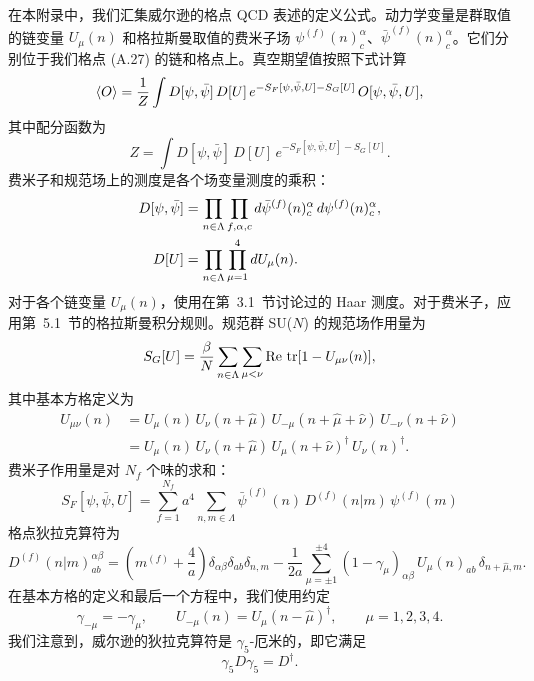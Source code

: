在本附录中，我们汇集威尔逊的格点 QCD 表述的定义公式。动力学变量是群取值的链变量 $U_\mu(n)$ 和格拉斯曼取值的费米子场 $\psi^{(f)}(n)^\alpha_c$、$\bar{\psi}^{(f)}(n)^\alpha_c$。它们分别位于我们格点 (A.27) 的链和格点上。真空期望值按照下式计算
\begin{equation}
  \left\langle O \right\rangle = \frac{1}{Z}\int D[\psi,\bar{\psi}]\,D[U]\,
  e^{-S_F[\psi,\bar{\psi},U]-S_G[U]}\,O[\psi,\bar{\psi},U],
\end{equation}
其中配分函数为
\begin{equation}
  Z = \int D[\psi,\bar{\psi}]\,D[U]\,
  e^{-S_F[\psi,\bar{\psi},U]-S_G[U]} .
\end{equation}
费米子和规范场上的测度是各个场变量测度的乘积：
\begin{align}
  D[\psi,\bar{\psi}] &= \prod_{n\in\Lambda}\prod_{f,\alpha,c}
  d\bar{\psi}^{(f)}(n)^\alpha_c\,d\psi^{(f)}(n)^\alpha_c, \notag\\
  D[U] &= \prod_{n\in\Lambda}\prod_{\mu=1}^{4} dU_\mu(n).
\end{align}
对于各个链变量 $U_\mu(n)$，使用在第~3.1~节讨论过的 Haar 测度。对于费米子，应用第~5.1~节的格拉斯曼积分规则。规范群 SU($N$) 的规范场作用量为
\begin{equation}
  S_G[U] = \frac{\beta}{N}\sum_{n\in\Lambda}\sum_{\mu<\nu}\operatorname{Re}\,\operatorname{tr}[1 - U_{\mu\nu}(n)],
\end{equation}
其中基本方格定义为
\begin{equation}
  \begin{split}
    U_{\mu\nu}(n) &= U_\mu(n)\,U_\nu(n+\hat{\mu})\,U_{-\mu}(n+\hat{\mu}+\hat{\nu})\,U_{-\nu}(n+\hat{\nu})\\
    &= U_\mu(n)\,U_\nu(n+\hat{\mu})\,U_\mu(n+\hat{\nu})^\dagger\,U_\nu(n)^\dagger .
  \end{split}
\end{equation}
费米子作用量是对 $N_f$ 个味的求和：
\begin{equation}
  S_F[\psi,\bar{\psi},U] = \sum_{f=1}^{N_f}a^4\sum_{n,m\in\Lambda}
  \bar{\psi}^{(f)}(n)\,D^{(f)}(n|m)\,\psi^{(f)}(m)
\end{equation}
格点狄拉克算符为
\begin{equation}
  D^{(f)}(n|m)^{\alpha\beta}_{ab} = \left( m^{(f)} + \frac{4}{a} \right)
  \delta_{\alpha\beta}\delta_{ab}\delta_{n,m}
  - \frac{1}{2a}\sum_{\mu=\pm1}^{\pm4}(1-\gamma_\mu)_{\alpha\beta}\,
  U_\mu(n)_{ab}\,\delta_{n+\hat{\mu},m}.
\end{equation}
在基本方格的定义和最后一个方程中，我们使用约定
\begin{equation}
  \gamma_{-\mu} = -\gamma_\mu,\qquad
  U_{-\mu}(n) = U_\mu(n-\hat{\mu})^\dagger,\qquad \mu = 1, 2, 3, 4 .
\end{equation}
我们注意到，威尔逊的狄拉克算符是 $\gamma_5$-厄米的，即它满足
\begin{equation}
  \gamma_5 D \gamma_5 = D^\dagger .
\end{equation}

